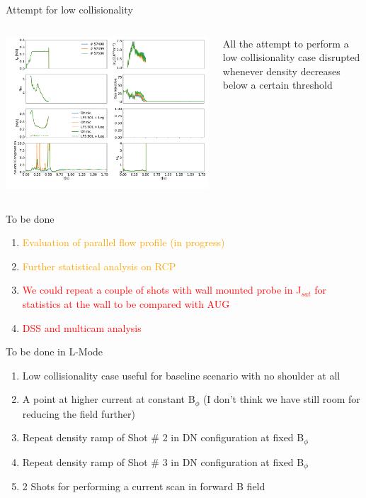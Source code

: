 \documentclass[10pt, compress]{beamer}
\newcommand\Fontvi{\fontsize{8}{7.2}\selectfont}
\begin{document}
\begin{frame}{Attempt for low collisionality}
  \begin{columns}[c]
    \begin{column}{0.7\textwidth}
      \includegraphics[width=8.cm]{../../Experiments/TCV/analysis/pdfbox/LowCollisionalityAttempt}
    \end{column}
    \begin{column}{0.3\textwidth}
      All the attempt to perform a low collisionality case disrupted
      whenever density decreases below a certain threshold
    \end{column}
  \end{columns}
\end{frame}

\begin{frame}{To be done}
  \Fontvi
  \begin{enumerate}
    \item \textcolor{orange}{ Evaluation of parallel flow profile (in
    progress)}
  \item \textcolor{orange}{ Further statistical analysis on RCP}
  \item \textcolor{red}{We could repeat a couple of shots with wall
      mounted probe in J$_{sat}$ for statistics at the wall to be
      compared with AUG}
  \item \textcolor{red}{DSS and multicam analysis}
  \end{enumerate}  
\end{frame}

\begin{frame}{To be done in L-Mode}
  \Fontvi
  \begin{enumerate}
\item  Low collisionality case useful for baseline scenario with no
  shoulder at all
\item  A point at higher current at constant B$_{\phi}$ (I don't think
  we have still room for reducing the field further)
\item  Repeat density ramp of Shot \# 2 in DN configuration at fixed B$_{\phi}$
\item  Repeat density ramp of Shot \# 3 in DN configuration at fixed B$_{\phi}$
\item  2 Shots for performing a current scan in forward B field
\end{enumerate}
\end{frame}
\end{document}
